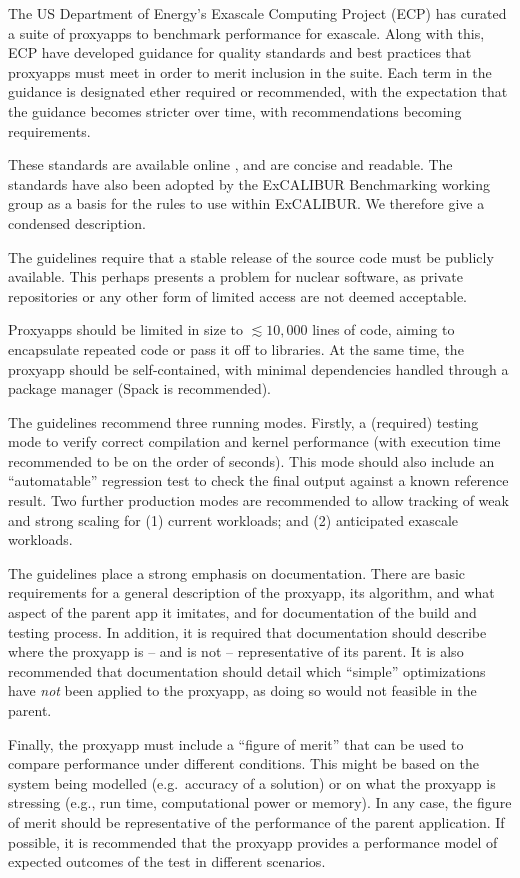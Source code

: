The US Department of Energy's Exascale Computing Project (ECP) \cite{ECP_website} has curated a suite of proxyapps \cite{ECP_proxyapp_website}
to benchmark performance for exascale.
Along with this, ECP have developed guidance for quality standards and best practices that proxyapps must meet in order to merit inclusion in the suite.
Each term in the guidance is designated ether required or recommended,
with the expectation that the guidance becomes stricter over time, with
recommendations becoming requirements.

These standards are available online \cite{ECP_proxyapp_standards_website},
and are concise and readable.
The standards have also been adopted by the ExCALIBUR Benchmarking working
group as a basis for the rules to use within ExCALIBUR.
We therefore give a condensed description.

The guidelines require that a stable release of the source code must be
publicly available.
This perhaps presents a problem for nuclear software, as private repositories
or any other form of limited access are not deemed acceptable.

Proxyapps should be limited in size to $\lesssim 10,000$ lines of code, aiming
to encapsulate repeated code or pass it off to libraries.
At the same time, the proxyapp should be self-contained, with minimal
dependencies handled through a package manager (Spack is recommended).

The guidelines recommend three running modes.
Firstly, a (required) testing mode to verify correct compilation and kernel
performance (with execution time recommended to be on the order of seconds).
This mode should also include an ``automatable'' regression test to check the
final output against a known reference result.
Two further production modes are recommended to allow tracking of weak and
strong scaling for 
(1) current workloads; and 
(2) anticipated exascale workloads.

The guidelines place a strong emphasis on documentation.
There are basic requirements for a general description of the proxyapp, 
its algorithm, and what aspect of the parent app it imitates, 
and for documentation of the build and testing process.
In addition, it is required that documentation should describe where the
proxyapp is -- and is not -- representative of its parent.
It is also recommended that documentation should detail which ``simple''
optimizations have \emph{not} been applied to the proxyapp, as doing so would
not feasible in the parent.

Finally, the proxyapp must include a ``figure of merit'' that can be used to
compare performance under different conditions. 
This might be based on the system being modelled (e.g.\ accuracy of a solution)
or on what the proxyapp is stressing (e.g., run time, computational power or
memory). 
In any case, the figure of merit should be representative of the performance of
the parent application.
If possible, it is recommended that the proxyapp provides a performance model
of expected outcomes of the test in different scenarios.


